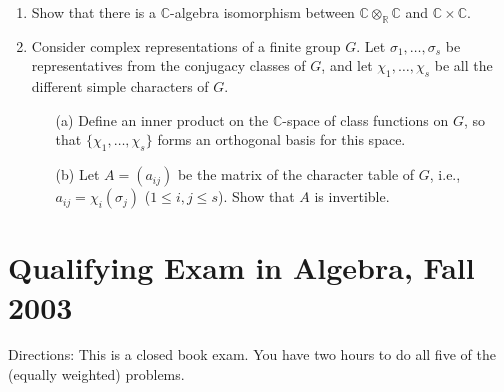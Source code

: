 \documentclass{article}
\begin{document}
\begin{enumerate}
    \item Show that there is a \(\mathbb{C}\)-algebra isomorphism between \(\mathbb{C} \otimes_{\mathbb{R}} \mathbb{C}\) and \(\mathbb{C} \times \mathbb{C}\).

    \item Consider complex representations of a finite group \(G\). Let \(\sigma_1, \ldots, \sigma_s\) be representatives from the conjugacy classes of \(G\), and let \(\chi_1, \ldots, \chi_s\) be all the different simple characters of \(G\).
    \begin{itemize}
        \item[(a)] Define an inner product on the \(\mathbb{C}\)-space of class functions on \(G\), so that \(\{\chi_1, \ldots, \chi_s\}\) forms an orthogonal basis for this space.
        \item[(b)] Let \(A = (a_{ij})\) be the matrix of the character table of \(G\), i.e., \(a_{ij} = \chi_i(\sigma_j)\) (\(1 \leq i, j \leq s\)). Show that \(A\) is invertible.
    \end{itemize}
\end{enumerate}

\section*{Qualifying Exam in Algebra, Fall 2003}

Directions: This is a closed book exam. You have two hours to do all five of the (equally weighted) problems.
\end{document}

